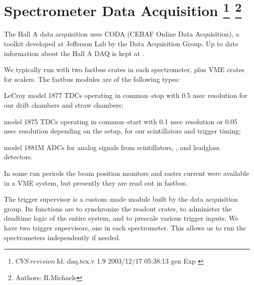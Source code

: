 \chapter[Spectrometer Data Acquisition]{Spectrometer Data Acquisition
\footnote{
  $CVS~revision~ $Id: daq.tex,v 1.9 2003/12/17 05:38:13 gen Exp $ $
}
\footnote{Authors: R.Michaels }
}





\par
The Hall A data acquisition uses CODA\cite{CODAwww}
(CEBAF Online Data Acquisition), a toolkit
developed at Jefferson Lab by the Data
Acquisition Group. 
Up to date information about the Hall A DAQ
is kept at 
.

\par
We typically run with two fastbus crates in
each spectrometer, plus VME crates for scalers.
The fastbus modules are of the following
types:
\begin{list}{.~}{\setlength{\itemsep}{-0.15cm}}
  \item LeCroy model
    1877 TDCs operating in common--stop with 0.5 nsec
    resolution for our drift chambers and
    straw chambers; 
  \item model 1875 TDCs operating in common--start with 0.1 nsec resolution
      or 0.05 nsec resolution depending on the setup,
      for our scintillators and trigger timing;
  \item model 1881M ADCs for analog signals from scintillators, 
        \Cherenkov{}, and leadglass detectors.
\end{list}
In some run periods the beam position monitors
and raster current were available in a VME system,
but presently they are read out in fastbus.

\par
The trigger supervisor is a custom--made
module built by the data
acquisition group.  Its functions are to
synchronize the readout crates, to administer
the deadtime logic of the entire system, and
to prescale various trigger inputs.  
We have two trigger supervisors,
one in each spectrometer.  This allows us to
run the spectrometers independently if needed.


